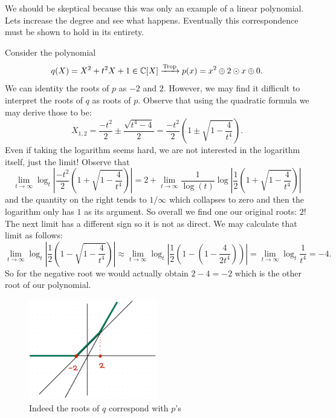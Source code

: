 \documentclass[12pt]{memoir}
\DeclareMathOperator{\Trop}{Trop}
\theoremstyle{definition}
\begin{document}
We should be skeptical because this was only an example of a linear polynomial. Lets increase the degree and see what happens. Eventually this correspondence must be shown to hold in its entirety.

\begin{Ex}
    Consider the polynomial
    $$q(X)=X^2+t^2X+1\in\bC[X]\xrightarrow[]{\Trop}p(x)=x^2\oplus 2\odot x\oplus 0.$$
    We can identity the roots of $p$ as $-2$ and $2$. However, we may find it difficult to interpret the roots of $q$ as roots of $p$. Observe that using the quadratic formula we may derive those to be:
    $$X_{1,2}=\frac{-t^2}{2}\pm\frac{\sqrt{t^4-4}}{2}=\frac{-t^2}{2}\left(1\pm\sqrt{1-\frac{4}{t^4}}\right).$$
    Even if taking the logarithm seems hard, we are not interested in the logarithm itself, just the limit! Observe that 
    $$\lim_{t\to\infty}\log_t\left|\frac{-t^2}{2}\left(1+\sqrt{1-\frac{4}{t^4}}\right)\right|=2+\lim_{t\to\infty}\frac{1}{\log(t)}\log\left|\frac{1}{2}\left(1+\sqrt{1-\frac{4}{t^4}}\right)\right|$$
    and the quantity on the right tends to $1/\infty$ which collapses to zero and then the logarithm only has $1$ as its argument. So overall we find one our original roots: $2$! The next limit has a different sign so it is not as direct. We may calculate that limit as follows:
    $$\lim_{t\to\infty}\log_t\left|\frac{1}{2}\left(1-\sqrt{1-\frac{4}{t^4}}\right)\right|\approx\lim_{t\to\infty}\log_t\left|\frac{1}{2}\left(1-\left(1-\frac{4}{2t^4}\right)\right)\right|=\lim_{t\to\infty}\log_t\frac{1}{t^4}=-4.$$
    So for the negative root we would actually obtain $2-4=-2$ which is the other root of our polynomial.
    \begin{figure}[h!]
        \centering
        \includegraphics[width=0.5\textwidth]{figs/fig4-5CorrespondenceRoots2Example.png}
        \caption{Indeed the roots of $q$ correspond with $p$'s}
        \label{fig:4.5-CorrespondenceRoots2Example}
    \end{figure}
\end{Ex}
\end{document}
